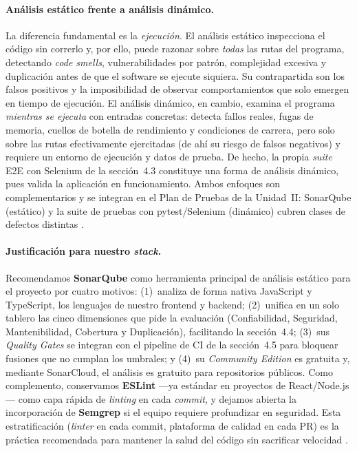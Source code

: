 \documentclass[12pt,a4paper]{article}
\begin{document}
\paragraph{Análisis estático frente a análisis dinámico.}
La diferencia fundamental es la \emph{ejecución}. El análisis estático inspecciona el
código sin correrlo y, por ello, puede razonar sobre \emph{todas} las rutas del programa,
detectando \textit{code smells}, vulnerabilidades por patrón, complejidad excesiva y
duplicación antes de que el software se ejecute siquiera. Su contrapartida son los falsos
positivos y la imposibilidad de observar comportamientos que solo emergen en tiempo de
ejecución. El análisis dinámico, en cambio, examina el programa \emph{mientras se ejecuta}
con entradas concretas: detecta fallos reales, fugas de memoria, cuellos de botella de
rendimiento y condiciones de carrera, pero solo sobre las rutas efectivamente ejercitadas
(de ahí su riesgo de falsos negativos) y requiere un entorno de ejecución y datos de
prueba. De hecho, la propia \textit{suite} E2E con Selenium de la sección~4.3 constituye
una forma de análisis dinámico, pues valida la aplicación en funcionamiento. Ambos enfoques
son complementarios y se integran en el Plan de Pruebas de la Unidad~II: SonarQube (estático)
y la suite de pruebas con pytest/Selenium (dinámico) cubren clases de defectos distintas
\citep{aniche2022, khorikov2020}.

\paragraph{Justificación para nuestro \textit{stack}.}
Recomendamos \textbf{SonarQube} como herramienta principal de análisis estático para el
proyecto por cuatro motivos: (1)~analiza de forma nativa JavaScript y TypeScript, los
lenguajes de nuestro frontend y backend; (2)~unifica en un solo tablero las cinco
dimensiones que pide la evaluación (Confiabilidad, Seguridad, Mantenibilidad, Cobertura y
Duplicación), facilitando la sección~4.4; (3)~sus \textit{Quality Gates} se integran con el
pipeline de CI de la sección~4.5 para bloquear fusiones que no cumplan los umbrales; y
(4)~su \textit{Community Edition} es gratuita y, mediante SonarCloud, el análisis es
gratuito para repositorios públicos. Como complemento, conservamos \textbf{ESLint} ---ya
estándar en proyectos de React/Node.js--- como capa rápida de \textit{linting} en cada
\textit{commit}, y dejamos abierta la incorporación de \textbf{Semgrep} si el equipo
requiere profundizar en seguridad. Esta estratificación (\textit{linter} en cada commit,
plataforma de calidad en cada PR) es la práctica recomendada para mantener la salud del
código sin sacrificar velocidad \citep{aniche2022}.
\end{document}
